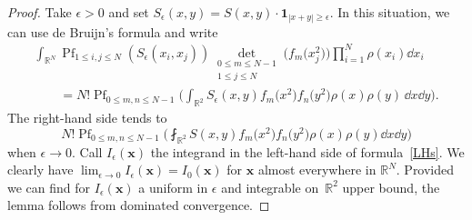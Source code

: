 \begin{proof} Take $\epsilon > 0$ and set $S_{\epsilon}(x,y) = S(x,y) \cdot \mathbf{1}_{|x + y| \geq \epsilon}$. In this situation, we can use de Bruijn's formula and write
\begin{gather}
\nonumber \int_{\mathbb{R}^N} \operatorname{Pf}_{1 \leq i,j \leq N} (S_{\epsilon}(x_i,x_j)) \mathop{\det}_{\substack{0 \leq m \leq N - 1 \\ 1 \leq j \leq N}} \bigl(f_m\bigl(x_j^2\bigr)\bigr) \prod_{i = 1}^N \rho(x_i)\dd x_i \\
\qquad {} = N!\operatorname{Pf}_{0 \leq m,n \leq N - 1} \biggl(\int_{\mathbb{R}^2} S_{\epsilon}(x,y)f_m\bigl(x^2\bigr)f_n\bigl(y^2\bigr)\rho(x)\rho(y)\,\dd x \dd y\biggr).\label{LHs}
\end{gather}
The right-hand side tends to
\[
N! \operatorname{Pf}_{0 \leq m,n \leq N - 1} \biggl(\fint_{\mathbb{R}^2} S(x,y) f_m\bigl(x^2\bigr)f_n\bigl(y^2\bigr)\rho(x)\rho(y)\dd x \dd y\biggr)
\]
 when ${\epsilon \rightarrow 0}$. Call $I_{\epsilon}(\mathbf{x})$ the integrand in the left-hand side of formula~\eqref{LHs}. We clearly have $\lim_{\epsilon \rightarrow 0} I_{\epsilon}(\mathbf{x}) = I_0(\mathbf{x})$ for $\mathbf{x}$ almost everywhere in $\mathbb{R}^N$. Provided we can find for $I_{\epsilon}(\mathbf{x})$ a uniform in $\epsilon$ and integrable on~$\mathbb{R}^2$ upper bound, the lemma follows from dominated convergence.


\end{proof}
